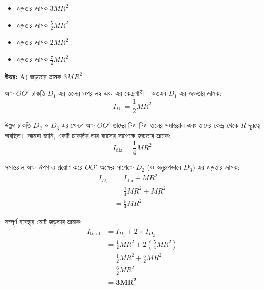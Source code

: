 \documentclass[12pt, a4paper]{article}
\begin{document}
\begin{itemize}[label={}, leftmargin=1cm, itemsep=0.5em]
    \item[\textbf{A)}] জড়তার ভ্রামক $3 M R^2$
    \item[\textbf{B)}] জড়তার ভ্রামক $\frac{5}{2} M R^2$
    \item[\textbf{C)}] জড়তার ভ্রামক $2 M R^2$
    \item[\textbf{D)}] জড়তার ভ্রামক $\frac{7}{2} M R^2$
\end{itemize}

\vspace{0.5em}
\begin{tcolorbox}[answerbox]
    \textbf{\color{success} উত্তর:} A) জড়তার ভ্রামক $3 M R^2$
\end{tcolorbox}
\vspace{1em}

\begin{tcolorbox}[solutionbox={সমাধান (Solution)}]
    \noindent
    অক্ষ $OO'$ চাকতি $D_1$-এর তলের ওপর লম্ব এবং এর কেন্দ্রগামী। 
    অতএব $D_1$-এর জড়তার ভ্রামক:
    \[ I_{D_1} = \frac{1}{2} M R^2 \]
    
    উল্লম্ব চাকতি $D_2$ ও $D_3$-এর ক্ষেত্রে অক্ষ $OO'$ তাদের নিজ নিজ তলের সমান্তরাল এবং তাদের কেন্দ্র থেকে $R$ দূরত্বে অবস্থিত।
    আমরা জানি, একটি চাকতির তার ব্যাসের সাপেক্ষে জড়তার ভ্রামক:
    \[ I_{\text{dia}} = \frac{1}{4} M R^2 \]
    
    সমান্তরাল অক্ষ উপপাদ্য প্রয়োগ করে $OO'$ অক্ষের সাপেক্ষে $D_2$ (ও অনুরূপভাবে $D_3$)-এর জড়তার ভ্রামক:
    \begin{align*}
        I_{D_2} &= I_{\text{dia}} + M R^2 \\
        &= \frac{1}{4} M R^2 + M R^2 \\
        &= \frac{5}{4} M R^2
    \end{align*}
    
    সম্পূর্ণ ব্যবস্থার মোট জড়তার ভ্রামক:
    \begin{align*}
        I_{\text{total}} &= I_{D_1} + 2 \times I_{D_2} \\
        &= \frac{1}{2} M R^2 + 2 \left(\frac{5}{4} M R^2\right) \\
        &= \frac{1}{2} M R^2 + \frac{5}{2} M R^2 \\
        &= \frac{6}{2} M R^2 \\
        &= \mathbf{3 M R^2}
    \end{align*}
\end{tcolorbox}
\end{document}
